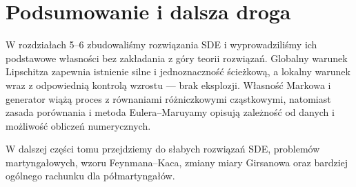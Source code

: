 \section{Podsumowanie i dalsza droga}
W rozdziałach 5--6 zbudowaliśmy rozwiązania SDE i
wyprowadziliśmy ich podstawowe własności bez
zakładania z góry teorii rozwiązań. Globalny warunek
Lipschitza zapewnia istnienie silne i jednoznaczność
ścieżkową, a lokalny warunek wraz z odpowiednią
kontrolą wzrostu — brak eksplozji. Własność Markowa
i generator wiążą proces z równaniami różniczkowymi
cząstkowymi, natomiast zasada porównania i metoda
Eulera--Maruyamy opisują zależność od danych i
możliwość obliczeń numerycznych.

W dalszej części tomu przejdziemy do słabych
rozwiązań SDE, problemów martyngałowych, wzoru
Feynmana--Kaca, zmiany miary Girsanowa oraz
bardziej ogólnego rachunku dla półmartyngałów.

